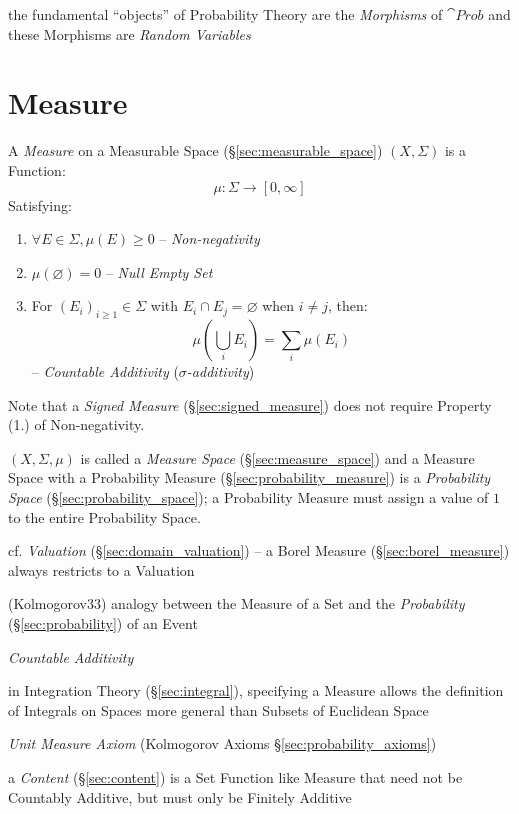 the fundamental ``objects'' of Probability Theory are the \emph{Morphisms} of
$\cat{Prob}$ and these Morphisms are \emph{Random Variables}



\section{Measure}\label{sec:measure}

A \emph{Measure} on a Measurable Space (\S\ref{sec:measurable_space})
$(X,\Sigma)$ is a Function:
\[
  \mu : \Sigma \rightarrow [0,\infty]
\]
Satisfying:
\begin{enumerate}
  \item $\forall E \in \Sigma, \mu(E) \geq 0$ -- \emph{Non-negativity}
  \item $\mu(\varnothing) = 0$ -- \emph{Null Empty Set}
  \item For $(E_i)_{i \geq 1} \in \Sigma$ with $E_i \cap E_j = \varnothing$
    when $i \neq j$, then:
    \[
      \mu (\bigcup_i E_i) = \sum_i \mu(E_i)
    \]
    -- \emph{Countable Additivity} (\emph{$\sigma$-additivity})
\end{enumerate}
Note that a \emph{Signed Measure} (\S\ref{sec:signed_measure}) does not require
Property (1.) of Non-negativity.

$(X,\Sigma,\mu)$ is called a \emph{Measure Space} (\S\ref{sec:measure_space})
and a Measure Space with a Probability Measure
(\S\ref{sec:probability_measure}) is a \emph{Probability Space}
(\S\ref{sec:probability_space}); a Probability Measure must assign a value of
$1$ to the entire Probability Space.

\fist cf. \emph{Valuation} (\S\ref{sec:domain_valuation}) -- a Borel Measure
(\S\ref{sec:borel_measure}) always restricts to a Valuation

(Kolmogorov33) analogy between the Measure of a Set and the \emph{Probability}
(\S\ref{sec:probability}) of an Event

\emph{Countable Additivity}

in Integration Theory (\S\ref{sec:integral}), specifying a Measure allows the
definition of Integrals on Spaces more general than Subsets of Euclidean Space

\fist \emph{Unit Measure Axiom} (Kolmogorov Axioms
\S\ref{sec:probability_axioms})

\fist a \emph{Content} (\S\ref{sec:content}) is a Set Function like Measure that
need not be Countably Additive, but must only be Finitely Additive


